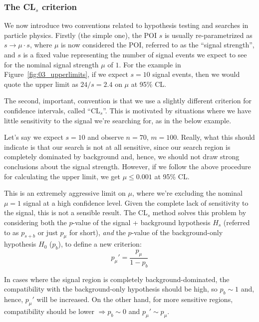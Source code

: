 \subsubsection{The \texorpdfstring{CL$_s$}{CLs} criterion}
\label{sec:03_cls}

We now introduce two conventions related to hypothesis testing and searches in particle physics.
Firstly (the simple one), the POI $s$ is usually re-parametrized as $s \rightarrow \mu \cdot s$,
where $\mu$ is now considered the POI, referred to as the ``signal strength'', and $s$ is a fixed value representing the number of signal events we expect to see for the nominal signal strength $\mu$ of $1$.
For the example in Figure~\ref{fig:03_upperlimits}, if we expect $s = 10$ signal events, then we would quote the upper limit as $24 / s = 2.4$ on $\mu$ at 95\% CL.

The second, important, convention is that we use a slightly different criterion for confidence intervals, called ``CL$_s$''.
This is motivated by situations where we have little sensitivity to the signal we're searching for, as in the below example.

\begin{example}
\label{ex:03_cls}
Let's say we expect $s = 10$ and observe $n = 70$, $m = 100$.
Really, what this should indicate is that our search is not at all sensitive, since our search region is completely dominated by background and, hence, we should not draw strong conclusions about the signal strength.
However, if we follow the above procedure for calculating the upper limit, we get $\mu \leq 0.001$ at 95\% CL.
\end{example}

This is an extremely aggressive limit on $\mu$, where we're excluding the nominal $\mu = 1$ signal at a high confidence level.
Given the complete lack of sensitivity to the signal, this is not a sensible result.
The CL$_s$ method solves this problem by considering both the $p$-value of the signal + background hypothesis $H_s$ (referred to as $p_{s+b}$ or just $p_\mu$ for short), \textit{and} the $p$-value of the background-only hypothesis $H_0$ ($p_b$), to define a new criterion:
\begin{equation}
p_\mu' = \frac{p_\mu}{1 - p_b}
\label{eq:03_pmu_prime}
\end{equation}

In cases where the signal region is completely background-dominated, the compatibility with the background-only hypothesis should be high, so $p_b \sim 1$ and, hence, $p_\mu'$ will be increased.
On the other hand, for more sensitive regions, compatibility should be lower $\Rightarrow p_b \sim 0$ and $p_\mu' \sim p_\mu$.

